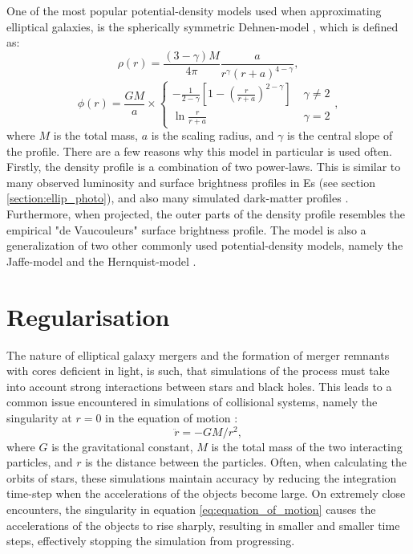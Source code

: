 \documentclass[english, twoside]{HYgradu}
\begin{document}
One of the most popular potential-density models used when approximating elliptical galaxies, is the spherically symmetric Dehnen-model \citep{Dehnen1993}, which is defined as:
\begin{equation}
\rho(r) = \frac{(3-\gamma)M}{4\pi} \frac{a}{r^\gamma (r+a)^{4-\gamma}}, \label{eq:dehnen_density}
\end{equation}
\begin{equation}
\phi(r) = \frac{GM}{a} \times 
\begin{cases}
	-\frac{1}{2-\gamma} \left[ 1 - \left( \frac{r}{r+a} \right)^{2-\gamma} \right] & \; \gamma \neq 2 \\
	\ln \frac{r}{r+a}	 & \; \gamma = 2
\end{cases},
\label{eq:dehnen_potential}
\end{equation}
where $M$ is the total mass, $a$ is the scaling radius, and $\gamma$ is the central slope of the profile. There are a few reasons why this model in particular is used often. Firstly, the density profile is a combination of two power-laws. This is similar to many observed luminosity and surface brightness profiles in Es (see section \ref{section:ellip_photo}), and also many simulated dark-matter profiles \citep{BinneyTremaine}. Furthermore, when projected, the outer parts of the density profile resembles the empirical "de Vaucouleurs" surface brightness profile. The model is also a generalization of two other commonly used potential-density models, namely the Jaffe-model and the Hernquist-model \citep[for these models $\gamma = 2$ and $\gamma = 1$ respectively][]{Jaffe1983, Hernquist1990}. 

\section{Regularisation} \label{section:regularisation}

The nature of elliptical galaxy mergers and the formation of merger remnants with cores deficient in light, is such, that simulations of the process must take into account strong interactions between stars and black holes. This leads to a common issue encountered in simulations of collisional systems, namely the singularity at $r=0$ in the equation of motion \citep{BinneyTremaine}:
\begin{equation}
\ddot{r} = -GM/r^2, \label{eq:equation_of_motion}
\end{equation}
where $G$ is the gravitational constant, $M$ is the total mass of the two interacting particles, and $r$ is the distance between the particles. Often, when calculating the orbits of stars, these simulations maintain accuracy by reducing the integration time-step when the accelerations of the objects become large. On extremely close encounters, the singularity in equation \ref{eq:equation_of_motion} causes the accelerations of the objects to rise sharply, resulting in smaller and smaller time steps, effectively stopping the simulation from progressing. 
\end{document}
